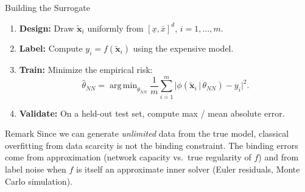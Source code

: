 \documentclass[aspectratio=169,11pt]{beamer}
\newcommand{\emphc}[1]{\textcolor{harvardcrimson}{#1}}
\newcommand{\x}{\bm{x}}
\DeclareMathOperator*{\argmin}{arg\,min}
\begin{document}
\begin{frame}{Building the Surrogate}
\begin{enumerate}
  \item \textbf{Design:} Draw $\tilde{\x}_i$ uniformly from $[\underline{x},\bar{x}]^d$, \quad $i = 1,\dots,m$.
  \item \textbf{Label:} Compute $y_i = f(\tilde{\x}_i)$ using the expensive model.
  \item \textbf{Train:} Minimize the empirical risk:
  \[
  \hat{\theta}_{NN} = \argmin_{\theta_{NN}} \frac{1}{m}\sum_{i=1}^{m}
  \bigl|\phi(\tilde{\x}_i\,|\,\theta_{NN}) - y_i\bigr|^2.
  \]
  \item \textbf{Validate:} On a held-out test set, compute max / mean absolute error.
\end{enumerate}

\vspace{0.4cm}
\begin{block}{Remark}
Since we can generate \emph{unlimited} data from the true model, classical overfitting from data scarcity is not the binding constraint. The binding errors come from \emphc{approximation} (network capacity vs.\ true regularity of $f$) and from \emphc{label noise} when $f$ is itself an approximate inner solver (Euler residuals, Monte Carlo simulation).
\end{block}
\end{frame}
\end{document}
